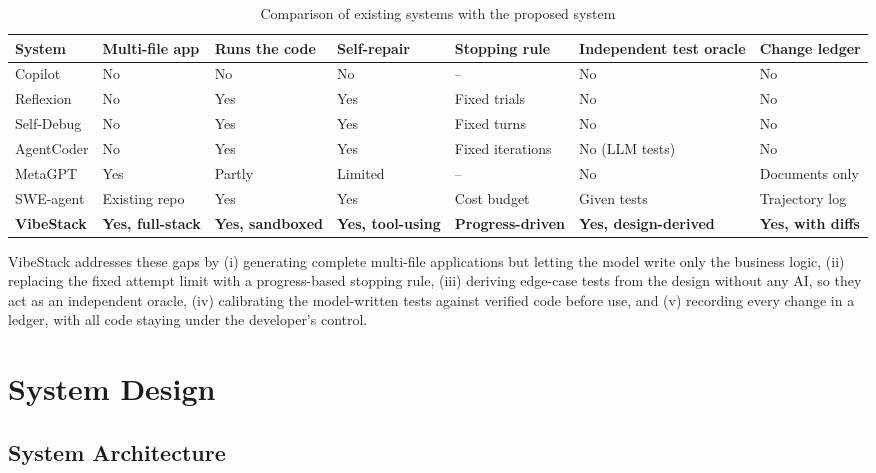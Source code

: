 \documentclass[12pt,a4paper]{report}
\begin{document}
\begin{table}[!ht]
    \centering
    \renewcommand{\arraystretch}{1.3}
    \footnotesize
    \caption{Comparison of existing systems with the proposed system}
    \label{tab:comparison}
    \begin{tabular}{|L{2.4cm}|L{1.6cm}|L{1.6cm}|L{1.6cm}|L{1.9cm}|L{2.0cm}|L{1.8cm}|}
    \hline
    \textbf{System} & \textbf{Multi-file app} & \textbf{Runs the code} & \textbf{Self-repair} & \textbf{Stopping rule} & \textbf{Independent test oracle} & \textbf{Change ledger} \\\hline
    Copilot \cite{copilot} & No & No & No & -- & No & No \\\hline
    Reflexion \cite{shinn2023reflexion} & No & Yes & Yes & Fixed trials & No & No \\\hline
    Self-Debug \cite{chen2024selfdebug} & No & Yes & Yes & Fixed turns & No & No \\\hline
    AgentCoder \cite{huang2023agentcoder} & No & Yes & Yes & Fixed iterations & No (LLM tests) & No \\\hline
    MetaGPT \cite{hong2024metagpt} & Yes & Partly & Limited & -- & No & Documents only \\\hline
    SWE-agent \cite{yang2024sweagent} & Existing repo & Yes & Yes & Cost budget & Given tests & Trajectory log \\\hline
    \textbf{VibeStack} & \textbf{Yes, full-stack} & \textbf{Yes, sandboxed} & \textbf{Yes, tool-using} & \textbf{Progress-driven} & \textbf{Yes, design-derived} & \textbf{Yes, with diffs} \\\hline
    \end{tabular}
\end{table}

VibeStack addresses these gaps by (i) generating complete multi-file applications but letting the model write only the business logic, (ii) replacing the fixed attempt limit with a progress-based stopping rule, (iii) deriving edge-case tests from the design without any AI, so they act as an independent oracle, (iv) calibrating the model-written tests against verified code before use, and (v) recording every change in a ledger, with all code staying under the developer's control.



\chapter{System Design}
\section{System Architecture}
\end{document}
